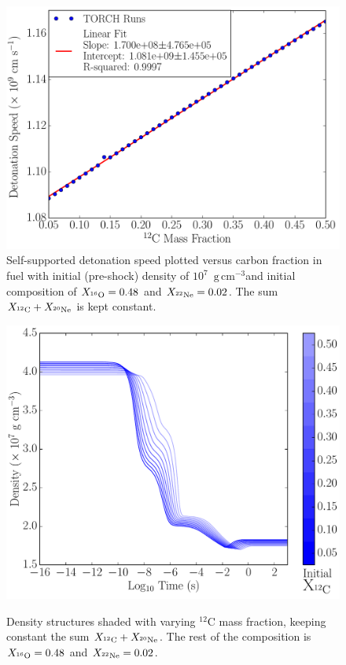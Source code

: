\documentclass[iop,apj]{emulateapj}
\newcommand{\unitspace}{\ensuremath{\,}}
\newcommand{\usp}{\unitspace}
\newcommand{\unitstyle}[1]{\ensuremath{\mathrm{#1}}}
\newcommand{\power}[2]{\ensuremath{{#1}^{#2}}}
\newcommand{\centi}{\unitstyle{c}}
\newcommand{\meter}{\unitstyle{m}}
\newcommand{\cm}{\centi\meter}
\newcommand{\gram}{\unitstyle{g}}
\newcommand{\grampercc}{\gram\usp\power{\cm}{-3}} %
\begin{document}
\begin{figure}
	\includegraphics[width=\linewidth]{figures/detonation_plotfiles/Vdet_vs_xc12_w_fit_includebump.pdf}
	\caption{\label{fig:detonation_velocity_wfit} Self-supported detonation speed plotted versus carbon fraction in fuel with initial (pre-shock) density of $10^7$~\grampercc and initial composition of $X_{^{16}\rm O} = 0.48$ and $X_{^{22}\rm Ne} = 0.02$. The sum $X_{^{12}\rm C} + X_{^{20}\rm Ne}$ is kept constant.\\}
\end{figure}

\begin{figure}[t]
	\includegraphics[width=0.95\linewidth]{figures/detonation_plotfiles/dens_multi_new.pdf}
        \caption{\label{fig:co_znd_multi_den}} Density structures shaded with varying $^{12}$C mass fraction, keeping constant the sum $X_{^{12}\rm C} + X_{^{20}\rm Ne}$. The rest of the composition is $X_{^{16}\rm O} = 0.48$ and $X_{^{22}\rm Ne} = 0.02$.
\end{figure}
\end{document}
